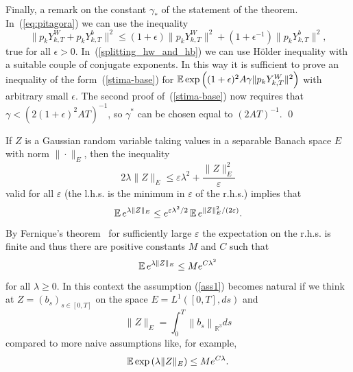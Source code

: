 Finally, a remark on the constant $\gamma_*$ of the statement of the
theorem. In~(\ref{eq:pitagora}) we can use the inequality
$$
\| p_k Y^W_{k,T} + p_k Y^b_{k,T} \|^2 \le (1+\epsilon) \| p_k
Y^W_{k,T}  \|^2 + (1+\epsilon^{-1}) \| p_k Y^b_{k,T} \|^2,
$$
true for all $\epsilon > 0$. In~(\ref{splitting_hw_and_hb}) we can use
H\"older inequality with a suitable couple of conjugate exponents. In
this way it is sufficient to prove an inequality of the
form~(\ref{stima-base}) for $\operatorname{{\mathbb E}} \exp\left( (1+\epsilon)^2 A
  \gamma \|p_k Y^W_{k,T}\|^2 \right)$ with arbitrary small
$\epsilon$. The second proof of~(\ref{stima-base}) now requires that
$\gamma < (2(1+\epsilon)^2 AT)^{-1}$, so $\gamma^*$ can be chosen equal
to $(2AT)^{-1}$.  \qed

\begin{remark} 
If $Z$ is a Gaussian random variable taking values in a separable Banach space
$E$ with norm $\|\cdot \|_E$, then the inequality
\begin{equation*}
2 \lambda \|Z\|_E \leq
\varepsilon \lambda ^{2}+\frac{\|Z\|_E^2}{\varepsilon }
\end{equation*}
valid for all $\varepsilon$ (the l.h.s. is the minimum in 
$\varepsilon$ of the r.h.s.) implies that
\begin{equation}
\operatorname{{\mathbb E}} e^{\lambda \|Z\|_E} \le e^{\varepsilon \lambda^2/2}
\operatorname{{\mathbb E}} e^{\|Z\|_E^2/(2\varepsilon)}.
\label{dominance}
\end{equation}
By Fernique's theorem~\cite{Fer} for sufficiently large $\varepsilon$ the
expectation on the r.h.s. is finite and thus there are positive constants $M$ and
$C$ such that
\begin{equation*}
\operatorname{{\mathbb E}} e^{\lambda \|Z\|_E}  \le Me^{C\lambda ^{2}}
\end{equation*}
for all $\lambda \ge 0$.
In this context the assumption (\ref{ass1}) becomes natural if we think at $Z =
(b_s)_{s\in[0,T]}$ on the space $E=L^1([0,T],ds)$ and
$$
\|Z\|_E = \int_{0}^{T}\left\| b_{s}\right\| _{\mathbb{R}^{3}} ds
$$
compared to more naive assumptions like, for example,   
$$
\expect  \exp
\left( \lambda \|Z\|_E \right) %
 \leq Me^{C\lambda }.$$
 \end{remark}



